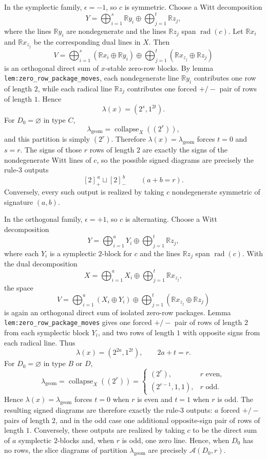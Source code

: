 \documentclass[
]{article}
\begin{document}
In the symplectic family, \(\epsilon=-1\), so \(c\) is symmetric. Choose
a Witt decomposition \[
Y=\bigoplus_{i=1}^s \mathbb R y_i \oplus \bigoplus_{j=1}^t \mathbb R z_j,
\] where the lines \(\mathbb R y_i\) are nondegenerate and the lines
\(\mathbb R z_j\) span \(\operatorname{rad}(c)\). Let \(\mathbb R x_i\)
and \(\mathbb R x_{z_j}\) be the corresponding dual lines in \(X\). Then
\[
V=\bigoplus_{i=1}^s (\mathbb R x_i\oplus \mathbb R y_i)
\oplus
\bigoplus_{j=1}^t (\mathbb R x_{z_j}\oplus \mathbb R z_j)
\] is an orthogonal direct sum of \(x\)-stable zero-row blocks. By lemma
\texttt{lem:zero\_row\_package\_moves}, each nondegenerate line
\(\mathbb R y_i\) contributes one row of length \(2\), while each
radical line \(\mathbb R z_j\) contributes one forced \(+/-\) pair of
rows of length \(1\). Hence \[
\lambda(x)=(2^s,1^{2t}).
\] For \(D_0=\varnothing\) in type \(C\), \[
\lambda_{\mathrm{geom}}=\operatorname{collapse}_X((2^r)),
\] and this partition is simply \((2^r)\). Therefore
\(\lambda(x)=\lambda_{\mathrm{geom}}\) forces \(t=0\) and \(s=r\). The
signs of those \(r\) rows of length \(2\) are exactly the signs of the
nondegenerate Witt lines of \(c\), so the possible signed diagrams are
precisely the rule-\(3\) outputs \[
[2]_+^{\,a}\sqcup [2]_-^{\,b}
\qquad(a+b=r).
\] Conversely, every such output is realized by taking \(c\)
nondegenerate symmetric of signature \((a,b)\).

In the orthogonal family, \(\epsilon=+1\), so \(c\) is alternating.
Choose a Witt decomposition \[
Y=\bigoplus_{i=1}^a Y_i \oplus \bigoplus_{j=1}^t \mathbb R z_j,
\] where each \(Y_i\) is a symplectic \(2\)-block for \(c\) and the
lines \(\mathbb R z_j\) span \(\operatorname{rad}(c)\). With the dual
decomposition \[
X=\bigoplus_{i=1}^a X_i \oplus \bigoplus_{j=1}^t \mathbb R x_{z_j},
\] the space \[
V=\bigoplus_{i=1}^a (X_i\oplus Y_i)
\oplus
\bigoplus_{j=1}^t (\mathbb R x_{z_j}\oplus \mathbb R z_j)
\] is again an orthogonal direct sum of isolated zero-row packages.
Lemma \texttt{lem:zero\_row\_package\_moves} gives one forced \(+/-\)
pair of rows of length \(2\) from each symplectic block \(Y_i\), and two
rows of length \(1\) with opposite signs from each radical line. Thus \[
\lambda(x)=(2^{2a},1^{2t}),
\qquad
2a+t=r.
\] For \(D_0=\varnothing\) in type \(B\) or \(D\), \[
\lambda_{\mathrm{geom}}=\operatorname{collapse}_X((2^r))
=
\begin{cases}
(2^r), & r \text{ even},\\
(2^{r-1},1,1), & r \text{ odd}.
\end{cases}
\] Hence \(\lambda(x)=\lambda_{\mathrm{geom}}\) forces \(t=0\) when
\(r\) is even and \(t=1\) when \(r\) is odd. The resulting signed
diagrams are therefore exactly the rule-\(3\) outputs: \(a\) forced
\(+/-\) pairs of length \(2\), and in the odd case one additional
opposite-sign pair of rows of length \(1\). Conversely, these outputs
are realized by taking \(c\) to be the direct sum of \(a\) symplectic
\(2\)-blocks and, when \(r\) is odd, one zero line. Hence, when \(D_0\)
has no rows, the slice diagrams of partition \(\lambda_{\mathrm{geom}}\)
are precisely \(\mathcal A(D_0,r)\).
\end{document}
